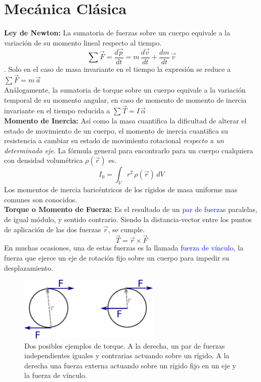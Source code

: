 \documentclass[12pt,a4paper]{article}
\begin{document}
\newpage

\section{Mecánica Clásica}
\textbf{Ley de Newton:} La sumatoria de fuerzas sobre un cuerpo equivale a la variación de su momento lineal respecto al tiempo.\\
$$\sum{\vec{F}} = \dfrac{d\vec{p}}{dt} = m \, \dfrac{d\vec{v}}{dt} + \dfrac{dm}{dt} \, \vec{v}$$.
Solo en el caso de masa invariante en el tiempo la expresión se reduce a $\sum {\vec{F}} = m \, \vec{a}$\\

Análogamente, la sumatoria de torque sobre un cuerpo equivale a la variación temporal de su momento angular, en caso de momento de momento de inercia invariante en el tiempo reducida a $\sum {\vec{T}} = I \, \vec{\alpha}$\\

\textbf{Momento de Inercia:} Así como la masa cuantifica la dificultad de alterar el estado de movimiento de un cuerpo, el momento de inercia cuantifica su resistencia a cambiar su estado de movimiento rotacional \emph{respecto a un determinado eje}. La fórmula general para encontrarlo para un cuerpo cualquiera con densidad volumétrica $\rho(\vec r)$ es.
$$I_0 = \int_{V}r^2 \, \rho(\vec{r})\, dV$$
Los momentos de inercia baricéntricos de los rígidos de masa uniforme mas comunes son conocidos.\\

\textbf{Torque o Momento de Fuerza: } Es el resultado de un \textcolor{blue}{par de fuerzas} paralelas, de igual módulo, y sentido contrario.
Siendo la distancia-vector entre los puntos de aplicación de las dos fuerzas $\vec{r}$, se cumple.
$$\vec{T}=\vec{r}\times\vec{F}$$
En muchas ocasiones, una de estas fuerzas es la llamada \textcolor{blue}{fuerza de vínculo}, la fuerza que ejerce un eje de rotación fijo sobre un cuerpo para impedir su desplazamiento.\\

\begin{figure}[htbp]
	\begin{center}
		\includegraphics[width=0.6\textwidth]{torque.eps}
		\caption{Dos posibles ejemplos de torque. A la derecha, un par de fuerzas independientes iguales y contrarias actuando sobre un rígido. A la derecha una fuerza externa actuando sobre un rígido fijo en un eje y la fuerza de vínculo.}
		\label{fig:torque}
	\end{center}
\end{figure}
\end{document}
